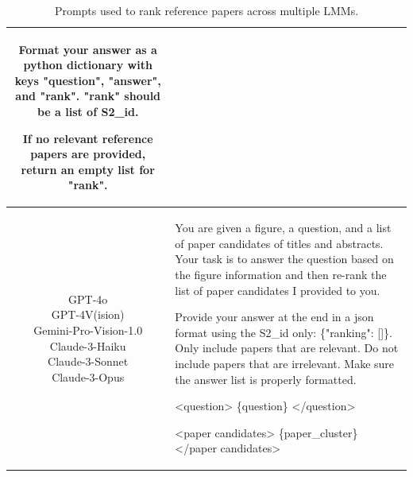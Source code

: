 \begin{table}[!t]
\begin{tabular}{cp{11.5cm}}
    Format your answer as a python dictionary with keys "question", "answer", and "rank". "rank" should be a list of S2\_id. 
    
    If no relevant reference papers are provided, return an empty list for "rank".
    \\
    \midrule
    \multirow{8}{*}{\parbox{4cm}{\centering GPT-4o\\GPT-4V(ision)\\Gemini-Pro-Vision-1.0\\Claude-3-Haiku\\Claude-3-Sonnet\\Claude-3-Opus}}
    & You are given a figure, a question, and a list of paper candidates of titles and abstracts. Your task is to answer the question based on the figure information and then re-rank the list of paper candidates I provided to you. 

        Provide your answer at the end in a json format using the S2\_id only: \{"ranking":  []\}.
        Only include papers that are relevant. Do not include papers that are irrelevant. Make sure the answer list is properly formatted.

        <question>
        \{question\}
        </question>

        <paper candidates>
        \{paper\_cluster\}
        </paper candidates>
    \\
    \bottomrule
\end{tabular}
\caption{Prompts used to rank reference papers across multiple LMMs.}
\label{tab:locality prompt}
\end{table}